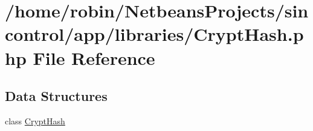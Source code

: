 \hypertarget{_crypt_hash_8php}{}\section{/home/robin/\+Netbeans\+Projects/sincontrol/app/libraries/\+Crypt\+Hash.php File Reference}
\label{_crypt_hash_8php}
\subsection*{Data Structures}
\begin{DoxyCompactItemize}
\item 
class \hyperlink{class_crypt_hash}{Crypt\+Hash}
\end{DoxyCompactItemize}
